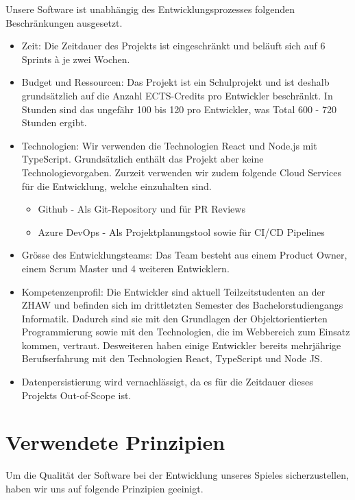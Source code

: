 \documentclass[11pt,a4paper,german]{scrartcl}
\let\oldsection\section
\renewcommand\section{\clearpage\oldsection}
\begin{document}
Unsere Software ist unabhängig des Entwicklungsprozesses folgenden Beschränkungen ausgesetzt.
\begin{itemize}
  \item Zeit: Die Zeitdauer des Projekts ist eingeschränkt und beläuft sich auf 6 Sprints à je zwei Wochen.
  \item Budget und Ressourcen: Das Projekt ist ein Schulprojekt und ist deshalb grundsätzlich auf die Anzahl ECTS-Credits pro Entwickler beschränkt. In Stunden sind das ungefähr 100 bis 120 pro Entwickler, was Total 600 - 720 Stunden ergibt.
  \item Technologien: Wir verwenden die Technologien React und Node.js mit TypeScript. Grundsätzlich enthält das Projekt aber keine Technologievorgaben. Zurzeit verwenden wir zudem folgende Cloud Services für die Entwicklung, welche einzuhalten sind.
        \begin{itemize}
          \item Github - Als Git-Repository und für PR Reviews
          \item Azure DevOps - Als Projektplanungstool sowie für CI/CD Pipelines
        \end{itemize}
  \item Grösse des Entwicklungsteams: Das Team besteht aus einem Product Owner, einem Scrum Master und 4 weiteren Entwicklern.
  \item Kompetenzenprofil: Die Entwickler sind aktuell Teilzeitstudenten an der ZHAW und befinden sich im drittletzten Semester des Bachelorstudiengangs Informatik. Dadurch sind sie mit den Grundlagen der Objektorientierten Programmierung sowie mit den Technologien, die im Webbereich zum Einsatz kommen, vertraut. Desweiteren haben einige Entwickler bereits mehrjährige Berufserfahrung mit den Technologien React, TypeScript und Node JS.
  \item Datenpersistierung wird vernachlässigt, da es für die Zeitdauer dieses Projekts Out-of-Scope ist.
\end{itemize}

\section{Verwendete Prinzipien}
Um die Qualität der Software bei der Entwicklung unseres Spieles sicherzustellen, haben wir uns auf folgende Prinzipien geeinigt.
\end{document}
